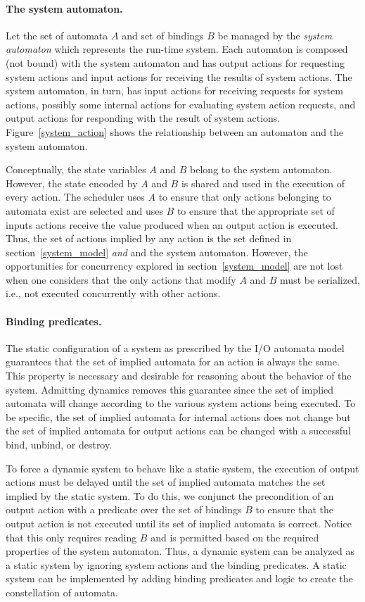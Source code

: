 \paragraph{The system automaton.}
Let the set of automata $A$ and set of bindings $B$ be managed by the \emph{system automaton} which represents the run-time system.
Each automaton is composed (not bound) with the system automaton and has output actions for requesting system actions and input actions for receiving the results of system actions.
The system automaton, in turn, has input actions for receiving requests for system actions, possibly some internal actions for evaluating system action requests, and output actions for responding with the result of system actions.
Figure~\ref{system_action} shows the relationship between an automaton and the system automaton.

Conceptually, the state variables $A$ and $B$ belong to the system automaton.
However, the state encoded by $A$ and $B$ is shared and used in the execution of every action.
The scheduler uses $A$ to ensure that only actions belonging to automata exist are selected and uses $B$ to ensure that the appropriate set of inputs actions receive the value produced when an output action is executed.
Thus, the set of actions implied by any action is the set defined in section~\ref{system_model} \emph{and} and the system automaton.
However, the opportunities for concurrency explored in section~\ref{system_model} are not lost when one considers that the only actions that modify $A$ and $B$ must be serialized, i.e., not executed concurrently with other actions.

\paragraph{Binding predicates.}
The static configuration of a system as prescribed by the I/O automata model guarantees that the set of implied automata for an action is always the same.
This property is necessary and desirable for reasoning about the behavior of the system.
Admitting dynamics removes this guarantee since the set of implied automata will change according to the various system actions being executed.
To be specific, the set of implied automata for internal actions does not change but the set of implied automata for output actions can be changed with a successful bind, unbind, or destroy.

To force a dynamic system to behave like a static system, the execution of output actions must be delayed until the set of implied automata matches the set implied by the static system.
To do this, we conjunct the precondition of an output action with a predicate over the set of bindings $B$ to ensure that the output action is not executed until its set of implied automata is correct.
Notice that this only requires reading $B$ and is permitted based on the required properties of the system automaton.
Thus, a dynamic system can be analyzed as a static system by ignoring system actions and the binding predicates.
A static system can be implemented by adding binding predicates and logic to create the constellation of automata.

